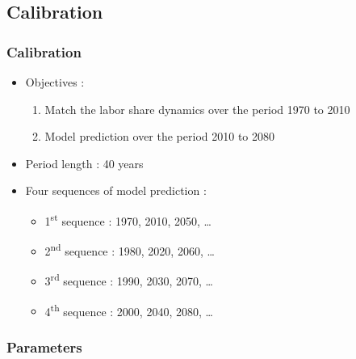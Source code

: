 \documentclass{beamer}
\begin{document}
		\subsection{Calibration}
			\begin{frame}\frametitle{Calibration}
				\begin{itemize}
					\item Objectives :
					\begin{enumerate}
						[default]
						\item Match the labor share dynamics over the period 1970 to 2010
						\item Model prediction over the period 2010 to 2080
					\end{enumerate}
				\end{itemize}
				\vspace{1em}
				\begin{itemize}
					\item Period length : 40 years
					\item Four sequences of model prediction :
					\begin{itemize}
						\item 1\textsuperscript{st} sequence : 1970, 2010, 2050, \dots
						\item 2\textsuperscript{nd} sequence : 1980, 2020, 2060, \dots
						\item 3\textsuperscript{rd} sequence : 1990, 2030, 2070, \dots
						\item 4\textsuperscript{th} sequence : 2000, 2040, 2080, \dots
					\end{itemize}
				\end{itemize}
			\end{frame}
		
			\begin{frame}[label = paraminit]\frametitle{Parameters}
				\begin{center}
					\resizebox{10cm}{!}{}
				\end{center}
				\hyperlink{leon<1>}{}
			\end{frame}
		
			\begin{frame}
				\begin{center}
					\resizebox{10cm}{!}{}
				\end{center}
			\end{frame}		
\end{document}
